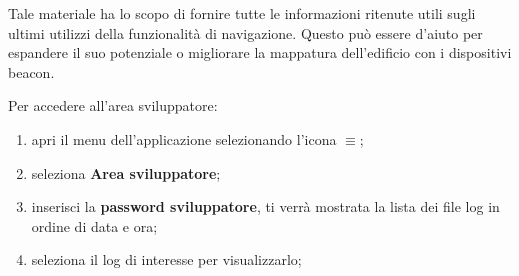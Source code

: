\documentclass[../ClipsManualeUtente.tex]{subfiles}
\begin{document}
		Tale materiale ha lo scopo di fornire tutte le informazioni ritenute utili sugli ultimi utilizzi della  funzionalità di navigazione. Questo può essere d'aiuto per espandere il suo potenziale o migliorare la mappatura dell'edificio con i dispositivi beacon.
		
		Per accedere all'area sviluppatore:
		\begin{enumerate}
			\item apri il menu dell'applicazione selezionando l'icona $\equiv$;
			\item seleziona \textbf{Area sviluppatore}; %
			\item inserisci la \textbf{password sviluppatore}, ti verrà mostrata la lista dei file log in ordine di data e ora;
			\item seleziona il log di interesse per visualizzarlo; 
		\end{enumerate}
\end{document}
